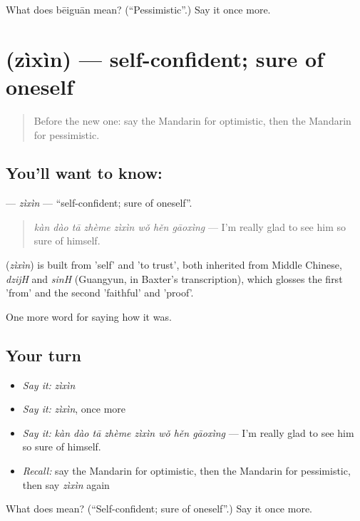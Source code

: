 \begin{tcolorbox}[breakable,colback=teal!4,colframe=teal!35!black,title={Before you move on}]
What does bēiguān mean? (\textquotedblleft{}Pessimistic\textquotedblright{}.) Say it once more.
\end{tcolorbox}
\section[\texorpdfstring{\zh{自信} (zìxìn)}{自信 (zìxìn)}]{ (zìxìn) — self-confident; sure of oneself}

\label{lesson:ZH-C465-zixin}



\begin{quote}
Before the new one: say the Mandarin for optimistic, then the Mandarin for pessimistic.
\end{quote}

\subsection*{You'll want to know: }
\textbf{} — \emph{zìxìn} — \textquotedblleft{}self-confident; sure of oneself\textquotedblright{}.

\begin{quote}
\textbf{} \emph{kàn dào tā zhème zìxìn wǒ hěn gāoxìng} — I'm really glad to see him so sure of himself.
\end{quote}

\begin{cousinweb}
\textbf{} (\emph{zìxìn}) is built from  'self' and  'to trust', both inherited from Middle Chinese, \emph{dzijH} and \emph{sinH} (Guangyun, in Baxter's transcription), which glosses the first 'from' and the second 'faithful' and 'proof'.
\end{cousinweb}

\begin{grammarlens}[title={What you've built}]
One more word for saying how it was.
\end{grammarlens}

\subsection*{Your turn}
\begin{itemize}
\raggedright
  \item \emph{Say it:} \emph{zìxìn}
  \item \emph{Say it:} \emph{zìxìn}, once more
  \item \emph{Say it:} \emph{kàn dào tā zhème zìxìn wǒ hěn gāoxìng} — I'm really glad to see him so sure of himself.
  \item \emph{Recall:} say the Mandarin for optimistic, then the Mandarin for pessimistic, then say \emph{zìxìn} again
\end{itemize}

\begin{tcolorbox}[breakable,colback=teal!4,colframe=teal!35!black,title={Before you move on}]
What does  mean? (\textquotedblleft{}Self-confident; sure of oneself\textquotedblright{}.) Say it once more.
\end{tcolorbox}
